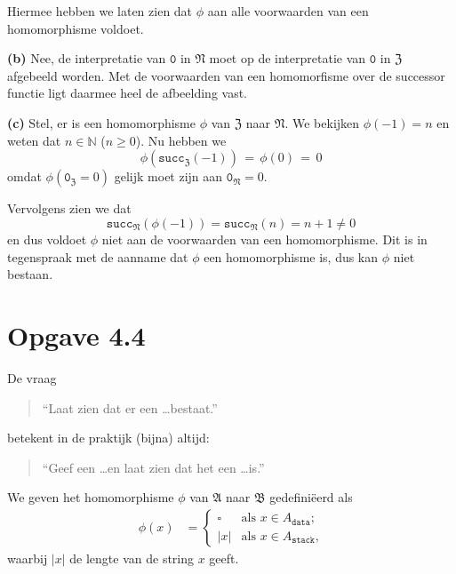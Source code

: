 \documentclass[a4paper,11pt]{article}
\begin{document}
\begin{description}
\begin{itemize}
\end{itemize}

Hiermee hebben we laten zien dat $\phi$ aan alle voorwaarden van een
homomorphisme voldoet.

\item{\bf (b)} %
Nee, de interpretatie van $\texttt{0}$ in $\mathfrak{N}$ moet op de
interpretatie van $\texttt{0}$ in $\mathfrak{Z}$ afgebeeld worden. Met de
voorwaarden van een homomorfisme over de successor functie ligt daarmee heel
de afbeelding vast.

\item{\bf (c)} %
Stel, er is een homomorphisme $\phi$ van $\mathfrak{Z}$ naar
$\mathfrak{N}$. We bekijken $\phi(-1)=n$ en weten dat $n \in \mathbb{N}$ ($n
\ge 0$). Nu hebben we
\begin{displaymath}
\phi(\texttt{succ}_{\mathfrak{Z}}(-1)) \, = \, \phi(0) \, = \, 0
\end{displaymath}
omdat $\phi(\texttt{0}_{\mathfrak{Z}}=0)$ gelijk moet zijn aan
$\texttt{0}_{\mathfrak{N}} = 0$.

Vervolgens zien we dat
\begin{displaymath}
\texttt{succ}_{\mathfrak{N}}(\phi(-1)) = \texttt{succ}_{\mathfrak{N}}(n) = n+1 \ne 0
\end{displaymath}
en dus voldoet $\phi$ niet aan de voorwaarden van een homomorphisme. Dit is in
tegenspraak met de aanname dat $\phi$ een homomorphisme is, dus kan $\phi$ niet
bestaan.

\end{description}


\section*{Opgave 4.4}

De vraag
\begin{quote}``Laat zien dat er een \ldots bestaat.''\end{quote}
betekent in de praktijk (bijna) altijd:
\begin{quote}``Geef een \ldots en laat zien dat het een \ldots is.''\end{quote}

We geven het homomorphisme $\phi$ van $\mathfrak{A}$ naar $\mathfrak{B}$
gedefini\"eerd als
\begin{align*}
\phi(x) &= \begin{cases}
  \square & \text{als $x \in A_{\texttt{data}}$;} \\
  |x|     & \text{als $x \in A_{\texttt{stack}}$,}
\end{cases}
\end{align*}
waarbij $|x|$ de lengte van de string $x$ geeft.
\end{document}
